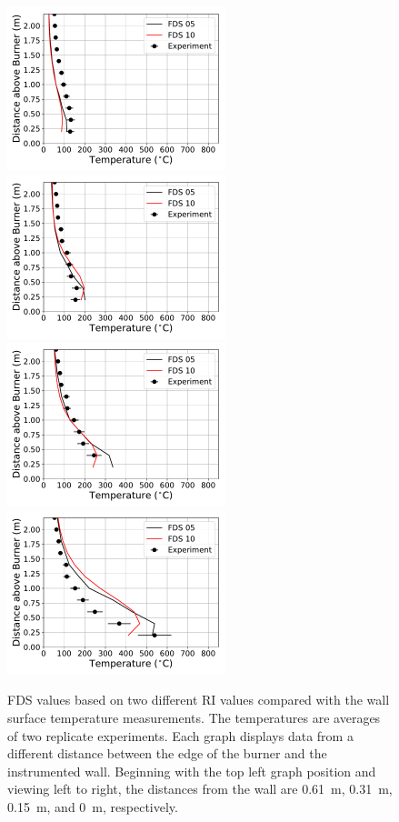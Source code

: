 \documentclass[twoside]{uocthesis}
\begin{document}
{\begin{figure}[ht!]
  \centering
  \includegraphics[width=2.5in]{../Figures/IWGB_NG_TC_Surface_Center_Avg_2D_RF_RI}
  \includegraphics[width=2.5in]{../Figures/IWGB_NG_TC_Surface_Center_Avg_1D_RF_RI}\\
  \includegraphics[width=2.5in]{../Figures/IWGB_NG_TC_Surface_Center_Avg_0p5D_RF_RI}
  \includegraphics[width=2.5in]{../Figures/IWGB_NG_TC_Surface_Center_Avg_0D_RF_RI}\\
  \caption[FDS values based on two different RI values compared with the wall surface temperature measurements.]{FDS values based on two different RI values compared with the wall surface temperature measurements. The temperatures are averages of two replicate experiments. Each graph displays data from a different distance between the edge of the burner and the instrumented wall.  Beginning with the top left graph position and viewing left to right, the distances from the wall are 0.61~m, 0.31~m, 0.15~m, and 0~m, respectively.}
  \label{FDS_Wall_Temp_IWGB_comp}
\end{figure}

}
\end{document}
